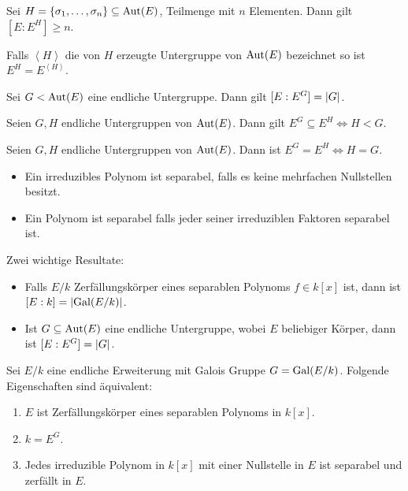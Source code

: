 \begin{lemma}
	Sei $H = \{\sigma_1,\ldots,\sigma_{n}\} \subseteq \operatorname{Aut}(E)$, Teilmenge mit $n$ Elementen.
	Dann gilt $[E : E^{H}] \geq n$.
\end{lemma}

\begin{claim}
	Falls $\left< H \right>	$ die von $H$ erzeugte Untergruppe von $\operatorname{Aut}(E)$ bezeichnet so ist $E^{H} = E^{\left< H \right>}$.
\end{claim}


\begin{proposition}
	Sei $G < \operatorname{Aut}(E)$ eine endliche Untergruppe. Dann gilt $[E : E^{G}] = \abs{G}$.
\end{proposition}


\begin{corollary}
	Seien $G,H$ endliche Untergruppen von $\operatorname{Aut}(E)$. Dann gilt $E^{G} \subseteq E^{H} \Leftrightarrow H < G$.
\end{corollary}


\begin{corollary}
	Seien $G,H$ endliche Untergruppen von $\operatorname{Aut}(E)$. Dann ist $E^{G} = E^{H} \Leftrightarrow H = G$.
\end{corollary}

\begin{definition}[Wiederholung]
	\begin{itemize}[-]
		\item Ein irreduzibles Polynom ist separabel, falls es keine mehrfachen Nullstellen besitzt.
		\item Ein Polynom ist separabel falls jeder seiner irreduziblen Faktoren separabel ist.
	\end{itemize}
\end{definition}

Zwei wichtige Resultate:
\begin{itemize}[-]
	\item Falls $E / k$ Zerfällungskörper eines separablen Polynoms $f \in k[x]$ ist, dann ist $[E:k] = \abs{\operatorname{Gal}(E / k)}$.
	\item Ist $G \subseteq \operatorname{Aut}(E)$ eine endliche Untergruppe, wobei $E$ beliebiger Körper, dann ist $[E : E^{G}] = \abs{G}$.
\end{itemize}

\begin{theorem}
	Sei $E / k$ eine endliche Erweiterung mit Galois Gruppe $G = \operatorname{Gal}(E / k)$. Folgende Eigenschaften sind äquivalent:
	\begin{enumerate}[(1)]
		\item $E$ ist Zerfällungskörper eines separablen Polynoms in $k[x]$.
		\item $k = E^{G}$.
		\item Jedes irreduzible Polynom in $k[x]$ mit einer Nullstelle in $E$ ist separabel und zerfällt in $E$.
	\end{enumerate}
\end{theorem}


